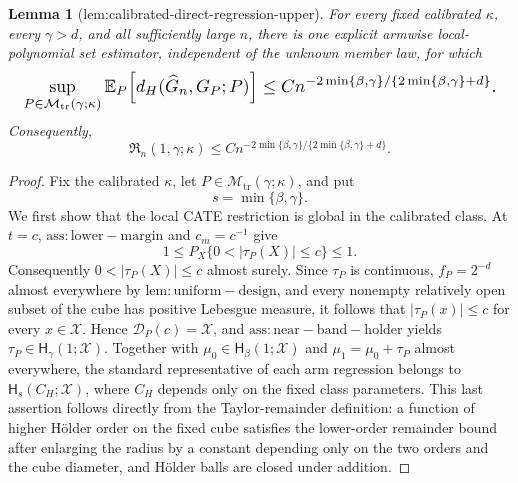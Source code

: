 \documentclass{article}
\newtheorem{lemma}{Lemma}
\begin{document}
\begin{lemma}[lem:calibrated-direct-regression-upper]\label{lem:calibrated-direct-regression-upper}
For every fixed calibrated \(\kappa\), every \(\gamma>d\), and all sufficiently large \(n\), there is one explicit armwise local-polynomial set estimator, independent of the unknown member law, for which
\[
\makebox[\linewidth][c]{\resizebox{0.98\linewidth}{!}{\(\displaystyle \sup_{P\in\mathcal M_{\mathrm{tr}}(\gamma;\kappa)}
 \mathbb E_P\!\left[d_H(\widehat G_n,G_P;P)\right]
 \le C n^{-2\min\{\beta,\gamma\}/\{2\min\{\beta,\gamma\}+d\}}.\)}}
\]
Consequently,
\[
 \mathfrak R_n(1,\gamma;\kappa)
 \le C n^{-2\min\{\beta,\gamma\}/\{2\min\{\beta,\gamma\}+d\}}.
\]
\end{lemma}
\begin{proof}
Fix the calibrated \(\kappa\), let \(P\in\mathcal M_{\mathrm{tr}}(\gamma;\kappa)\), and put
\[
s=\min\{\beta,\gamma\}.
\]
We first show that the local CATE restriction is global in the calibrated class. At \(t=c\), \(\mathrm{ass:lower-margin}\) and \(c_m=c^{-1}\) give
\[
1\le P_X\{0<|\tau_P(X)|\le c\}\le1.
\]
Consequently \(0<|\tau_P(X)|\le c\) almost surely. Since \(\tau_P\) is continuous, \(f_P=2^{-d}\) almost everywhere by \(\mathrm{lem:uniform-design}\), and every nonempty relatively open subset of the cube has positive Lebesgue measure, it follows that \(|\tau_P(x)|\le c\) for every \(x\in\mathcal X\). Hence \(\mathcal D_P(c)=\mathcal X\), and \(\mathrm{ass:near-band-holder}\) yields \(\tau_P\in\mathsf H_\gamma(1;\mathcal X)\). Together with \(\mu_0\in\mathsf H_\beta(1;\mathcal X)\) and \(\mu_1=\mu_0+\tau_P\) almost everywhere, the standard representative of each arm regression belongs to \(\mathsf H_s(C_H;\mathcal X)\), where \(C_H\) depends only on the fixed class parameters. This last assertion follows directly from the Taylor-remainder definition: a function of higher Hölder order on the fixed cube satisfies the lower-order remainder bound after enlarging the radius by a constant depending only on the two orders and the cube diameter, and Hölder balls are closed under addition.


\end{proof}
\end{document}
